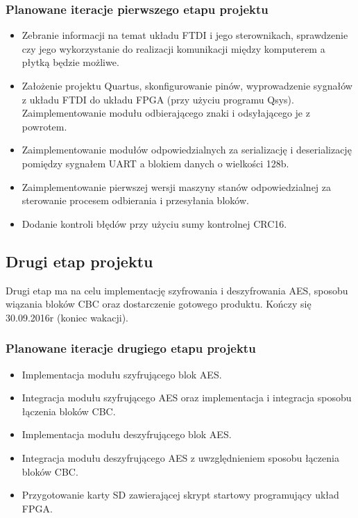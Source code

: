 \subsubsection{Planowane iteracje pierwszego etapu projektu}
\begin{itemize}
\item Zebranie informacji na temat układu FTDI i jego sterownikach, sprawdzenie czy jego wykorzystanie do realizacji komunikacji między komputerem a płytką będzie możliwe.
\item Założenie projektu Quartus, skonfigurowanie pinów, wyprowadzenie sygnałów z układu FTDI do układu FPGA (przy użyciu programu Qsys). Zaimplementowanie modułu odbierającego znaki i odsyłającego je z powrotem.
\item Zaimplementowanie modułów odpowiedzialnych za serializację i deserializację pomiędzy sygnałem UART a blokiem danych o wielkości 128b.
\item Zaimplementowanie pierwszej wersji maszyny stanów odpowiedzialnej za sterowanie procesem odbierania i przesyłania bloków.
\item Dodanie kontroli błędów przy użyciu sumy kontrolnej CRC16.
\end{itemize}

\subsection{Drugi etap projektu}
Drugi etap ma na celu implementację szyfrowania i deszyfrowania AES, sposobu wiązania bloków CBC oraz dostarczenie gotowego produktu. Kończy się 30.09.2016r (koniec wakacji).
\subsubsection{Planowane iteracje drugiego etapu projektu}
\begin{itemize}
\item Implementacja modułu szyfrującego blok AES.
\item Integracja modułu szyfrującego AES oraz implementacja i integracja sposobu łączenia bloków CBC.
\item Implementacja modułu deszyfrującego blok AES.
\item Integracja modułu deszyfrującego AES z uwzględnieniem sposobu łączenia bloków CBC.
\item Przygotowanie karty SD zawierającej skrypt startowy programujący układ FPGA.
\end{itemize}

